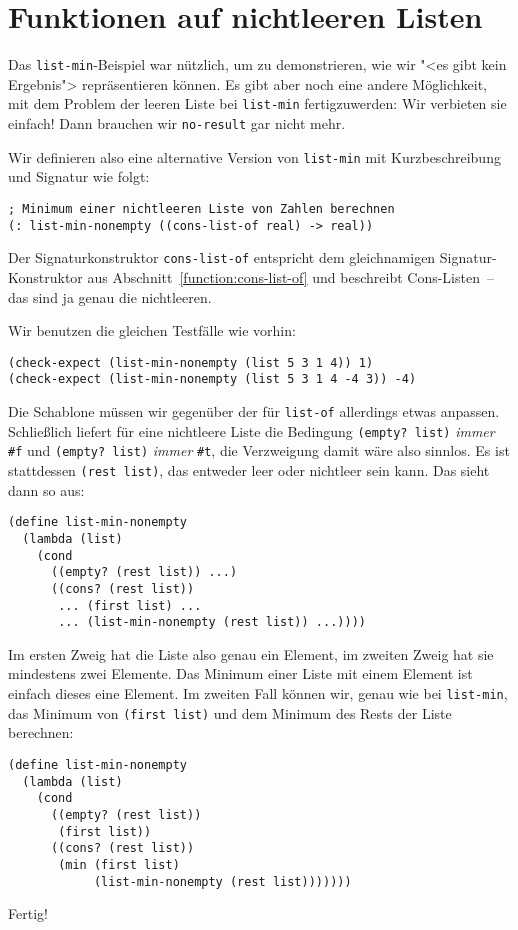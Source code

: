 \section{Funktionen auf nichtleeren Listen}
\label{sec:list-min-nonempty}

Das \lstinline{list-min}-Beispiel war nützlich, um zu demonstrieren,
wie wir "<es gibt kein Ergebnis"> repräsentieren können.  Es gibt aber
noch eine andere Möglichkeit, mit dem Problem der leeren Liste bei
\lstinline{list-min} fertigzuwerden: Wir verbieten sie einfach!  Dann
brauchen wir \lstinline{no-result} gar nicht mehr.

Wir definieren also eine alternative Version von \lstinline{list-min}
mit Kurzbeschreibung und Signatur wie folgt:
%
\begin{lstlisting}
; Minimum einer nichtleeren Liste von Zahlen berechnen
(: list-min-nonempty ((cons-list-of real) -> real))
\end{lstlisting}
%
Der Signaturkonstruktor \lstinline{cons-list-of} entspricht dem
gleichnamigen Signatur-Konstruktor aus
Abschnitt~\ref{function:cons-list-of} und beschreibt Cons-Listen~--
das sind ja genau die nichtleeren.

Wir benutzen die gleichen Testfälle wie vorhin:
%
\begin{lstlisting}
(check-expect (list-min-nonempty (list 5 3 1 4)) 1)
(check-expect (list-min-nonempty (list 5 3 1 4 -4 3)) -4)
\end{lstlisting}
%
Die Schablone müssen wir gegenüber der für \lstinline{list-of}
allerdings etwas anpassen.  Schließlich liefert für eine nichtleere
Liste die Bedingung \lstinline{(empty? list)} \emph{immer}
\lstinline{#f} und \lstinline{(empty? list)} \emph{immer}
\lstinline{#t}, die Verzweigung damit wäre also sinnlos.  Es ist
stattdessen \lstinline{(rest list)}, das entweder leer oder nichtleer
sein kann.  Das sieht dann so aus:
%
\begin{lstlisting}
(define list-min-nonempty
  (lambda (list)
    (cond
      ((empty? (rest list)) ...)
      ((cons? (rest list))
       ... (first list) ...
       ... (list-min-nonempty (rest list)) ...))))
\end{lstlisting}
%
Im ersten Zweig hat die Liste also genau ein Element, im zweiten Zweig
hat sie mindestens zwei Elemente.  Das Minimum einer Liste mit einem
Element ist einfach dieses eine Element.  Im zweiten Fall können wir,
genau wie bei \lstinline{list-min}, das Minimum von
\lstinline{(first list)} und dem Minimum des Rests der Liste
berechnen:
%
\begin{lstlisting}
(define list-min-nonempty
  (lambda (list)
    (cond
      ((empty? (rest list))
       (first list))
      ((cons? (rest list))
       (min (first list)
            (list-min-nonempty (rest list)))))))
\end{lstlisting}
%
Fertig!

